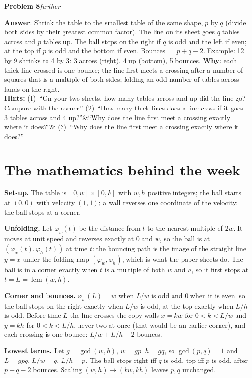 \documentclass[11pt,letterpaper]{article}
\newcommand{\prob}[3]{\needspace{3\baselineskip}\par\smallskip\textbf{#1}\enspace\textit{#2}\enspace{\small(#3)}\par}
\newcommand{\ans}{\textbf{Answer:} }
\newcommand{\hints}[3]{\textbf{Hints:} (1)~#1 (2)~#2\ifx&#3&\else{} (3)~#3\fi\par}
\newcommand{\further}{further}
\begin{document}
\prob{Problem 8}{\further}{page 8}
\ans Shrink the table to the smallest table of the same shape, $p$ by $q$ (divide both sides by their greatest common factor). The line on its sheet goes $q$ tables across and $p$ tables up. The ball stops on the right if $q$ is odd and the left if even; at the top if $p$ is odd and the bottom if even. Bounces $= p + q - 2$. Example: 12 by 9 shrinks to 4 by 3: 3 across (right), 4 up (bottom), 5 bounces. \textbf{Why:} each thick line crossed is one bounce; the line first meets a crossing after a number of squares that is a multiple of both sides; folding an odd number of tables across lands on the right.\\
\hints{``On your two sheets, how many tables across and up did the line go? Compare with the corner.''}{``How many thick lines does a line cross if it goes 3 tables across and 4 up?''}{``Why does the line first meet a crossing exactly where it does?''}

\section{The mathematics behind the week}

\textbf{Set-up.} The table is $[0,w]\times[0,h]$ with $w,h$ positive integers; the ball starts at $(0,0)$ with velocity $(1,1)$; a wall reverses one coordinate of the velocity; the ball stops at a corner.

\textbf{Unfolding.} Let $\varphi_w(t)$ be the distance from $t$ to the nearest multiple of $2w$. It moves at unit speed and reverses exactly at $0$ and $w$, so the ball is at $(\varphi_w(t),\varphi_h(t))$ at time $t$: the bouncing path is the image of the straight line $y=x$ under the folding map $(\varphi_w,\varphi_h)$, which is what the paper sheets do. The ball is in a corner exactly when $t$ is a multiple of both $w$ and $h$, so it first stops at $t = L = \operatorname{lcm}(w,h)$.

\textbf{Corner and bounces.} $\varphi_w(L) = w$ when $L/w$ is odd and $0$ when it is even, so the ball stops on the right exactly when $L/w$ is odd, at the top exactly when $L/h$ is odd. Before time $L$ the line crosses the copy walls $x=kw$ for $0<k<L/w$ and $y=kh$ for $0<k<L/h$, never two at once (that would be an earlier corner), and each crossing is one bounce: $L/w + L/h - 2$ bounces.

\textbf{Lowest terms.} Let $g=\gcd(w,h)$, $w = gp$, $h = gq$, so $\gcd(p,q)=1$ and $L = gpq$, $L/w = q$, $L/h = p$. The ball stops right iff $q$ is odd, top iff $p$ is odd, after $p+q-2$ bounces. Scaling $(w,h)\mapsto(kw,kh)$ leaves $p,q$ unchanged.
\end{document}
